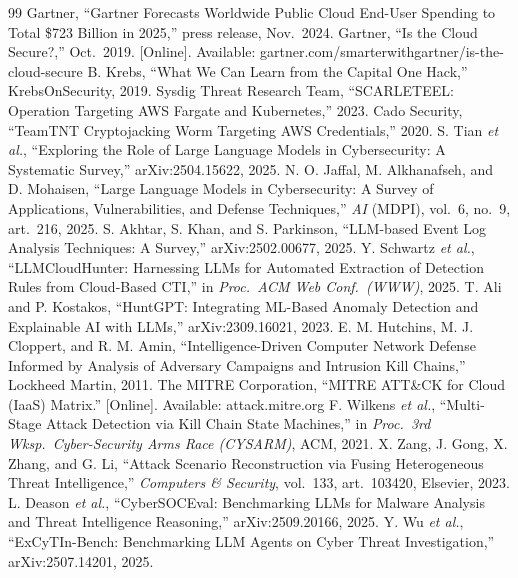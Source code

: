 \documentclass[journal]{IEEEtran}
\begin{document}
\begin{thebibliography}{99}
 Gartner, ``Gartner Forecasts Worldwide Public Cloud End-User Spending to Total \$723 Billion in 2025,'' press release, Nov.\ 2024.
 Gartner, ``Is the Cloud Secure?,'' Oct.\ 2019. [Online]. Available: gartner.com/smarterwithgartner/is-the-cloud-secure
 B. Krebs, ``What We Can Learn from the Capital One Hack,'' KrebsOnSecurity, 2019.
 Sysdig Threat Research Team, ``SCARLETEEL: Operation Targeting AWS Fargate and Kubernetes,'' 2023.
 Cado Security, ``TeamTNT Cryptojacking Worm Targeting AWS Credentials,'' 2020.
 S. Tian \emph{et al.}, ``Exploring the Role of Large Language Models in Cybersecurity: A Systematic Survey,'' arXiv:2504.15622, 2025.
 N. O. Jaffal, M. Alkhanafseh, and D. Mohaisen, ``Large Language Models in Cybersecurity: A Survey of Applications, Vulnerabilities, and Defense Techniques,'' \emph{AI} (MDPI), vol.\ 6, no.\ 9, art.\ 216, 2025.
 S. Akhtar, S. Khan, and S. Parkinson, ``LLM-based Event Log Analysis Techniques: A Survey,'' arXiv:2502.00677, 2025.
 Y. Schwartz \emph{et al.}, ``LLMCloudHunter: Harnessing LLMs for Automated Extraction of Detection Rules from Cloud-Based CTI,'' in \emph{Proc.\ ACM Web Conf.\ (WWW)}, 2025.
 T. Ali and P. Kostakos, ``HuntGPT: Integrating ML-Based Anomaly Detection and Explainable AI with LLMs,'' arXiv:2309.16021, 2023.
 E. M. Hutchins, M. J. Cloppert, and R. M. Amin, ``Intelligence-Driven Computer Network Defense Informed by Analysis of Adversary Campaigns and Intrusion Kill Chains,'' Lockheed Martin, 2011.
 The MITRE Corporation, ``MITRE ATT\&CK for Cloud (IaaS) Matrix.'' [Online]. Available: attack.mitre.org
 F. Wilkens \emph{et al.}, ``Multi-Stage Attack Detection via Kill Chain State Machines,'' in \emph{Proc.\ 3rd Wksp.\ Cyber-Security Arms Race (CYSARM)}, ACM, 2021.
 X. Zang, J. Gong, X. Zhang, and G. Li, ``Attack Scenario Reconstruction via Fusing Heterogeneous Threat Intelligence,'' \emph{Computers \& Security}, vol.\ 133, art.\ 103420, Elsevier, 2023.
 L. Deason \emph{et al.}, ``CyberSOCEval: Benchmarking LLMs for Malware Analysis and Threat Intelligence Reasoning,'' arXiv:2509.20166, 2025.
 Y. Wu \emph{et al.}, ``ExCyTIn-Bench: Benchmarking LLM Agents on Cyber Threat Investigation,'' arXiv:2507.14201, 2025.

\end{thebibliography}
\end{document}
